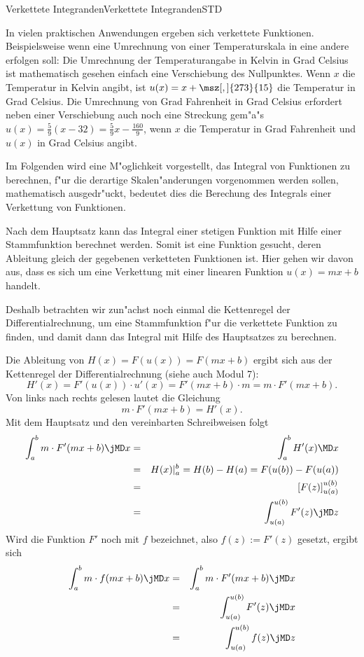 \begin{MXContent}{Verkettete Integranden}{Verkettete Integranden}{STD}

In vielen praktischen Anwendungen ergeben sich verkettete Funktionen.
Beispielsweise wenn eine Umrechnung von einer Temperaturskala in eine andere
erfolgen soll: Die Umrechnung der Temperaturangabe in Kelvin in Grad Celsius 
ist mathematisch gesehen einfach eine Verschiebung des Nullpunktes. 
Wenn $x$ die Temperatur in Kelvin angibt, ist $u(x) = x + \msz[,]{273}{15}$ die 
Temperatur in Grad Celsius. Die Umrechnung von Grad Fahrenheit in 
Grad Celsius erfordert neben einer Verschiebung auch noch eine Streckung  
gem"a"s $u(x) = \frac{5}{9} (x - 32) = \frac{5}{9} x - \frac{160}{9}$, 
wenn $x$ die Temperatur in Grad Fahrenheit und $u(x)$ in Grad Celsius angibt.

Im Folgenden wird eine M"oglichkeit vorgestellt, das Integral von Funktionen
zu berechnen, f"ur die derartige Skalen"anderungen vorgenommen werden sollen, 
mathematisch ausgedr"uckt, bedeutet dies die Berechung des Integrals einer 
Verkettung von Funktionen.

Nach dem Hauptsatz kann das Integral einer stetigen Funktion mit Hilfe einer 
Stammfunktion berechnet werden. Somit ist eine Funktion gesucht, deren 
Ableitung gleich der gegebenen verketteten Funktionen ist.  
Hier gehen wir davon aus, dass es sich um eine Verkettung mit einer linearen 
Funktion $u(x) = m x + b$ handelt.

Deshalb betrachten wir zun"achst noch einmal die Kettenregel der 
Differentialrechnung, um eine Stammfunktion f"ur die verkettete Funktion 
zu finden, und damit dann das Integral mit Hilfe des Hauptsatzes zu berechnen.

Die Ableitung von $H(x) = F(u(x)) = F(m x + b)$ ergibt sich aus der Kettenregel 
der Differentialrechnung (siehe auch Modul 7):
\[
H'(x) = F'(u(x)) \cdot u'(x) = F'(m x + b) \cdot m = m \cdot F'(m x + b). %
\]
Von links nach rechts gelesen lautet die Gleichung
\[
m \cdot F'(m x + b) = H'(x). %
\]
Mit dem Hauptsatz und den vereinbarten Schreibweisen folgt
\begin{eqnarray*}
\int_a^b m \cdot F'(m x + b) \jMD x %
 & = & \int_a^b H'(x) \MD x \\
 & = & H(x)|_a^b = H(b) - H(a) = F(u(b)) - F(u(a)) \\
 & = & \left[F(z)\right]_{u(a)}^{u(b)} \\
 & = & \int_{u(a)}^{u(b)} F'(z) \jMD z %
\end{eqnarray*}
Wird die Funktion $F'$ noch mit $f$ bezeichnet, also $f(z) := F'(z)$ gesetzt,
ergibt sich
\begin{eqnarray*}
\int_a^b m \cdot f(m x + b) \jMD x %
 & = & \int_a^b m \cdot F'(m x + b) \jMD x \\
 & = & \int_{u(a)}^{u(b)} F'(z) \jMD x \\
 & = & \int_{u(a)}^{u(b)} f(z) \jMD z %
\end{eqnarray*}


\end{MXContent}
